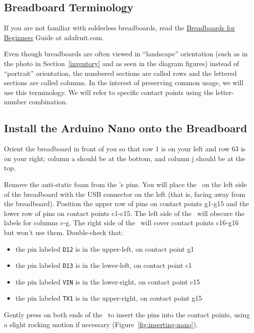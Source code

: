 \subsection{Breadboard Terminology}

If you are not familiar with solderless breadboards, read the
\href{https://learn.adafruit.com/breadboards-for-beginners?view=all}{Breadboards for Beginners}
Guide at adafruit.com.

Even though breadboards are often viewed in ``landscape'' orientation (such
as in the photo in Section~\ref{inventory} and as seen in the diagram figures)
instead of ``portrait'' orientation, the numbered sections are called rows and
the lettered sections are called columns. In the interest of preserving common
usage, we will use this terminology. We will refer to specific contact points
using the letter- number combination.

\subsection{Install the Arduino Nano onto the Breadboard}

Orient the breadboard in front of you so that row 1 is on your left and row 63
is on your right; column a should be at the bottom, and column j should be at
the top.

Remove the anti-static foam from the \nano's pins. You will place the
\nano\ on the left side of the breadboard with the USB connector on the
left (that is, facing away from the breadboard). Position the upper row of pins
on contact points g1-g15 and the lower row of pins on contact points c1-c15.
The left side of the \nano\ will obscure the labels for columns c-g. The
right side of the \nano\ will cover contact points c16-g16 but won't use
them. Double-check that:
 \begin{itemize}
    \item the pin labeled \texttt{D12} is in the upper-left, on contact point g1
    \item the pin labeled \texttt{D13} is in the lower-left, on contact point c1
    \item the pin labeled \texttt{VIN} is in the lower-right, on contact point
        c15
    \item the pin labeled \texttt{TX1} is in the upper-right, on contact point
        g15
\end{itemize}

Gently press on both ends of the \nano\ to insert the pins into the
contact points, using a slight rocking motion if necessary (Figure~\ref{fig:inserting-nano}).

